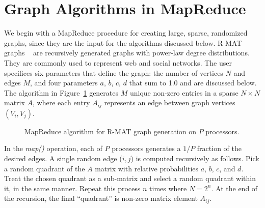 \section{Graph Algorithms in MapReduce}
\label{sec:graph}

We begin with a MapReduce procedure for creating large, sparse,
randomized graphs, since they are the input for the algorithms
discussed below.  R-MAT graphs ~\cite{RMAT} are recursively generated
graphs with power-law degree distributions.  They are commonly used to
represent web and social networks.  The user specifices six parameters
that define the graph: the number of vertices $N$ and edges $M$, and
four parameters $a$, $b$, $c$, $d$ that sum to 1.0 and are discussed
below.  The algorithm in Figure~\ref{fig:rmat} generates $M$ unique
non-zero entries in a sparse $N \times N$ matrix $A$, where each entry
$A_{ij}$ represents an edge between graph vertices $(V_i,V_j)$.

\begin{figure}[htb]
 \begin{center}\end{center}

 \caption{MapReduce algorithm for R-MAT graph generation on $P$ processors.}

 \label{fig:rmat}
\end{figure}

In the {\it map()} operation, each of $P$ processors generates a $1/P$
fraction of the desired edges.  A single random edge ($i,j$) is computed
recursively as follows.  Pick a random quadrant of the $A$ matrix with
relative probabilities $a$, $b$, $c$, and $d$.  Treat the chosen
quadrant as a sub-matrix and select a random quadrant within it, in
the same manner.  Repeat this process $n$ times where $N = 2^n$.  At
the end of the recursion, the final ``quadrant'' is non-zero matrix
element $A_{ij}$.

